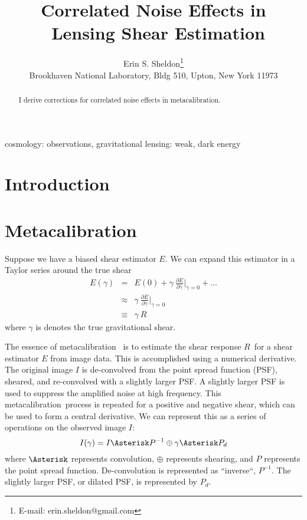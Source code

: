 \documentclass[usegraphicx,usenatbib]{mn2e}
\title{Correlated Noise Effects in \Mcal\ Lensing Shear Estimation}
\author[Erin S. Sheldon]{Erin S. Sheldon\thanks{E-mail: erin.sheldon@gmail.com}\\
Brookhaven National Laboratory, Bldg 510, Upton, New York 11973}
\newcommand{\mcal}{metacalibration}
\newcommand{\Mcal}{Metacalibration}
\newcommand{\mcalR}{$R$}
\begin{document}
\maketitle

\begin{abstract}

I derive corrections for correlated noise effects in \mcal.   

\end{abstract}


\begin{keywords}                                                                    
    cosmology: observations,
    gravitational lensing: weak,
    dark energy
\end{keywords} 

\section{Introduction} \label{sec:intro}

\section{\Mcal} \label{sec:algo}

Suppose we have a biased shear estimator $E$.  We can expand this estimator
in a Taylor series around the true shear
\begin{eqnarray}
    E(\gamma) & = & E(0) + \gamma ~ \frac{ \partial E }{ \partial \gamma }\bigg|_{\gamma=0}  + ... \nonumber \\
      & \approx & \gamma ~ \frac{ \partial E }{ \partial \gamma } \bigg|_{\gamma=0}  \\
      & \equiv & \gamma ~ R \nonumber
\end{eqnarray}
where $\gamma$ is denotes the true gravitational shear.

The essence of \mcal\ \citep{HuffMcal} is to estimate the shear response
\mcalR\ for a shear estimator $E$ from image data.  This is accomplished using
a numerical derivative.  The original image $I$ is de-convolved from the point
spread function (PSF), sheared, and re-convolved with a slightly larger PSF.  A
slightly larger PSF is used to suppress the amplified noise at high
frequency.  This \mcal\ process is repeated for a positive and negative
shear, which can be used to form a central derivative.  We can represent this
as a series of operations on the observed image $I$:
\begin{equation}
    I(\gamma) = I \Asterisk P^{-1} \oplus \gamma \Asterisk P_{d}
\end{equation}
where $\Asterisk$ represents convolution, $\oplus$ represents shearing,
and $P$ represents the point spread function.  De-convolution
is represented as ``inverse``, $P^{-1}$.  The slightly larger PSF, or
dilated PSF, is represented by $P_{d}$.
\end{document}
